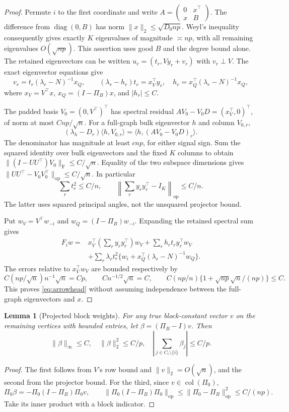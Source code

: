 \documentclass[11pt]{article}
\newtheorem{lemma}[theorem]{Lemma}
\newcommand{\op}{\mathrm{op}}
\newcommand{\F}{\mathrm F}
\begin{document}
\begin{proof}
Permute $i$ to the first coordinate and write $A=\left(\begin{smallmatrix}0&x^\top\\x&B\end{smallmatrix}\right)$. The difference from $\operatorname{diag}(0,B)$ has norm $\|x\|_2\le\sqrt{D_0np}$. Weyl's inequality consequently gives exactly $K$ eigenvalues of magnitude $\asymp np$, with all remaining eigenvalues $O(\sqrt{np})$. This assertion uses good $B$ and the degree bound alone. The retained eigenvectors can be written $u_r=(t_r,Vy_r+v_r)$ with $v_r\perp V$. The exact eigenvector equations give
\[
 v_r=t_r(\lambda_r-N)^{-1}x_Q,\qquad
 (\lambda_r-h_r)t_r=x_V^\top y_r,
 \quad h_r=x_Q^\top(\lambda_r-N)^{-1}x_Q,
\]
where $x_V=V^\top x$, $x_Q=(I-\Pi_B)x$, and $|h_r|\le C$.

The padded basis $V_0=(0,V^\top)^\top$ has spectral residual $AV_0-V_0D=(x_V^\top,0)^\top$, of norm at most $Cnp/\sqrt n$. For a full-graph bulk eigenvector $h$ and column $V_{0,r}$,
\[
 (\lambda_h-D_r)\langle h,V_{0,r}\rangle
 =\langle h,(AV_0-V_0D)_r\rangle.
\]
The denominator has magnitude at least $c np$, for either signal sign. Sum the squared identity over bulk eigenvectors and the fixed $K$ columns to obtain $\|(I-UU^\top)V_0\|_\F\le C/\sqrt n$. Equality of the two subspace dimensions gives $\|UU^\top-V_0V_0^\top\|_\op\le C/\sqrt n$. In particular
\[
 \sum_rt_r^2\le C/n,\qquad
 \left\|\sum_ry_ry_r^\top-I_K\right\|_\op\le C/n.
\]
The latter uses squared principal angles, not the unsquared projector bound.

Put $w_V=V^\top w_{-i}$ and $w_Q=(I-\Pi_B)w_{-i}$. Expanding the retained spectral sum gives
\begin{align*}
 F_iw={}&x_V^\top\left(\sum_ry_ry_r^\top\right)w_V
       +\sum_r h_rt_ry_r^\top w_V\\
 &+\sum_r\lambda_rt_r^2
       \{w_i+x_Q^\top(\lambda_r-N)^{-1}w_Q\}.
\end{align*}
The errors relative to $x_V^\top w_V$ are bounded respectively by
\[
 C(np/\sqrt n)n^{-1}\sqrt n=Cp,\qquad Cn^{-1/2}\sqrt n=C,
 \qquad C(np/n)\{1+\sqrt{np}\sqrt n/(np)\}\le C.
\]
This proves \eqref{eq:arrowhead} without assuming independence between the full-graph eigenvectors and $x$.
\end{proof}

\begin{lemma}[Projected block weights]\label{lem:weights}
For any true block-constant vector $v$ on the remaining vertices with bounded entries, let $\beta=(\Pi_B-I)v$. Then
\[
 \|\beta\|_\infty\le C,\quad \|\beta\|_2^2\le C/p,
 \quad \left|\sum_{j\in C_c\setminus\{i\}}\beta_j\right|\le C/p.
\]
\end{lemma}
\begin{proof}
The first follows from $V$'s row bound and $\|v\|_2=O(\sqrt n)$, and the second from the projector bound. For the third, since $v\in\operatorname{col}(\Pi_0)$,
\[
 \Pi_0\beta=-\Pi_0(I-\Pi_B)\Pi_0v,
 \qquad\|\Pi_0(I-\Pi_B)\Pi_0\|_\op
 \le\|\Pi_0-\Pi_B\|_\op^2\le C/(np).
\]
Take its inner product with a block indicator.
\end{proof}
\end{document}
